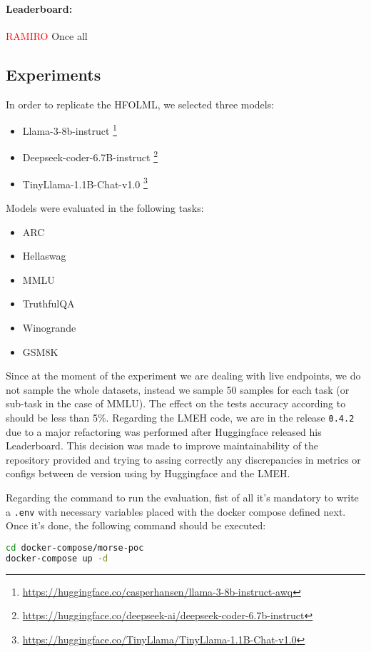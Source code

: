 \paragraph{Leaderboard:}
\textcolor{red}{RAMIRO}
Once all


\subsection{Experiments}

In order to replicate the \gls{HFOLML}, we selected three models:

\begin{itemize}[noitemsep]
    \item Llama-3-8b-instruct \footnote{\url{https://huggingface.co/casperhansen/llama-3-8b-instruct-awq}}
    \item Deepseek-coder-6.7B-instruct \footnote{\url{https://huggingface.co/deepseek-ai/deepseek-coder-6.7b-instruct}}
    \item TinyLlama-1.1B-Chat-v1.0 \footnote{\url{https://huggingface.co/TinyLlama/TinyLlama-1.1B-Chat-v1.0}}
\end{itemize}

Models were evaluated in the following tasks:

\begin{itemize}[noitemsep]
    \item ARC
    \item Hellaswag
    \item MMLU
    \item TruthfulQA
    \item Winogrande
    \item GSM8K
\end{itemize}

Since at the moment of the experiment we are dealing with live endpoints, we do not sample the whole datasets, instead we sample 50 samples for each task (or sub-task in the case of MMLU). 
The effect on the tests accuracy according to \citeauthor{polo_tinybenchmarks_2024} \cite{polo_tinybenchmarks_2024} should be less than 5\%. 
Regarding the \gls{LMEH} \cite{biderman_lessons_2024} code, we are in the release \verb|0.4.2| due to a major refactoring was performed after Huggingface released his Leaderboard. 
This decision was made to improve maintainability of the repository provided and trying to assing correctly any discrepancies in metrics or configs between de version using by Huggingface and the \gls{LMEH}. 

Regarding the command to run the evaluation, fist of all it's mandatory to write a \verb|.env| with necessary variables placed with the docker compose defined next. 
Once it's done, the following command should be executed:
\begin{lstlisting}[language=bash, caption={Command to run the evaluation.}, numbers=none]
cd docker-compose/morse-poc
docker-compose up -d
\end{lstlisting}


